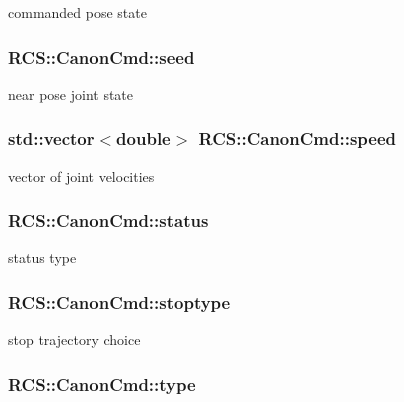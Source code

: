 commanded pose state \hypertarget{structRCS_1_1CanonCmd_a577caa222abd73e6490108c7aecbc61c}{
\subsubsection[{seed}]{ R\-C\-S\-::\-Canon\-Cmd\-::seed}}\label{structRCS_1_1CanonCmd_a577caa222abd73e6490108c7aecbc61c}
near pose joint state \hypertarget{structRCS_1_1CanonCmd_aa31954bd04399469490123786ee17496}{
\subsubsection[{speed}]{\setlength{\rightskip}{0pt plus 5cm}std\-::vector$<$double$>$ R\-C\-S\-::\-Canon\-Cmd\-::speed}}\label{structRCS_1_1CanonCmd_aa31954bd04399469490123786ee17496}
vector of joint velocities \hypertarget{structRCS_1_1CanonCmd_a8ad6bd631d2cf99c00ec267791680236}{
\subsubsection[{status}]{ R\-C\-S\-::\-Canon\-Cmd\-::status}}\label{structRCS_1_1CanonCmd_a8ad6bd631d2cf99c00ec267791680236}
status type \hypertarget{structRCS_1_1CanonCmd_a22bc418b884c7afabf0a2d3538f74cad}{
\subsubsection[{stoptype}]{ R\-C\-S\-::\-Canon\-Cmd\-::stoptype}}\label{structRCS_1_1CanonCmd_a22bc418b884c7afabf0a2d3538f74cad}
stop trajectory choice \hypertarget{structRCS_1_1CanonCmd_abf1d51c90a3f1b4c5796292c53cbde01}{
\subsubsection[{type}]{ R\-C\-S\-::\-Canon\-Cmd\-::type}}\label{structRCS_1_1CanonCmd_abf1d51c90a3f1b4c5796292c53cbde01}
